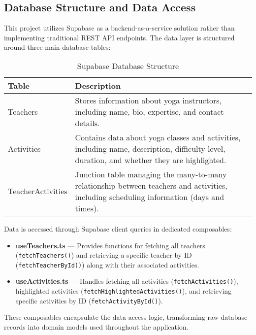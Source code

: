 \subsection{Database Structure and Data Access}

This project utilizes Supabase as a backend-as-a-service solution rather than implementing traditional REST API endpoints. The data layer is structured around three main database tables:

\begin{table}[H]
    \centering
    \begin{tabular}{|p{3cm}|p{10cm}|}
        \hline
        \rowcolor{bluepoli!20}
        \textbf{Table} & \textbf{Description} \\
        \hline
        Teachers & Stores information about yoga instructors, including name, bio, expertise, and contact details. \\
        \hline
        Activities & Contains data about yoga classes and activities, including name, description, difficulty level, duration, and whether they are highlighted. \\
        \hline
        TeacherActivities & Junction table managing the many-to-many relationship between teachers and activities, including scheduling information (days and times). \\
        \hline
    \end{tabular}
    \caption{Supabase Database Structure}

\end{table}

Data is accessed through Supabase client queries in dedicated composables:

\begin{itemize}
    \item \textbf{useTeachers.ts} --- Provides functions for fetching all teachers (\texttt{fetchTeachers()}) and retrieving a specific teacher by ID (\texttt{fetchTeacherById()}) along with their associated activities.
    
    \item \textbf{useActivities.ts} --- Handles fetching all activities (\texttt{fetchActivities()}), highlighted activities (\texttt{fetchHighlightedActivities()}), and retrieving specific activities by ID (\texttt{fetchActivityById()}).
\end{itemize}

These composables encapsulate the data access logic, transforming raw database records into domain models used throughout the application.

